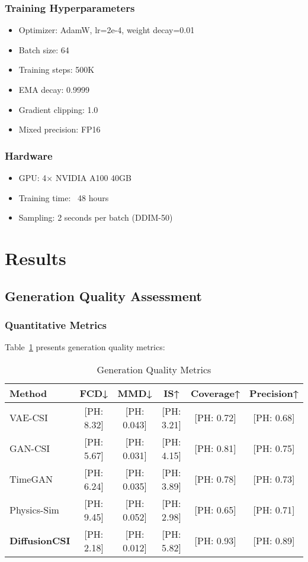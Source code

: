 \documentclass[journal]{IEEEtran}
\begin{document}
\subsubsection{Training Hyperparameters}
\begin{itemize}
\item Optimizer: AdamW, lr=2e-4, weight decay=0.01
\item Batch size: 64
\item Training steps: 500K
\item EMA decay: 0.9999
\item Gradient clipping: 1.0
\item Mixed precision: FP16
\end{itemize}

\subsubsection{Hardware}
\begin{itemize}
\item GPU: 4× NVIDIA A100 40GB
\item Training time: ~48 hours
\item Sampling: 2 seconds per batch (DDIM-50)
\end{itemize}

\section{Results}

\subsection{Generation Quality Assessment}

\subsubsection{Quantitative Metrics}
Table~\ref{tab:quality} presents generation quality metrics:

\begin{table}[h]
\centering
\caption{Generation Quality Metrics}
\label{tab:quality}
\begin{tabular}{lccccc}
\toprule
Method & FCD↓ & MMD↓ & IS↑ & Coverage↑ & Precision↑ \\
\midrule
VAE-CSI & [PH: 8.32] & [PH: 0.043] & [PH: 3.21] & [PH: 0.72] & [PH: 0.68] \\
GAN-CSI & [PH: 5.67] & [PH: 0.031] & [PH: 4.15] & [PH: 0.81] & [PH: 0.75] \\
TimeGAN & [PH: 6.24] & [PH: 0.035] & [PH: 3.89] & [PH: 0.78] & [PH: 0.73] \\
Physics-Sim & [PH: 9.45] & [PH: 0.052] & [PH: 2.98] & [PH: 0.65] & [PH: 0.71] \\
\textbf{DiffusionCSI} & [PH: 2.18] & [PH: 0.012] & [PH: 5.82] & [PH: 0.93] & [PH: 0.89] \\
\bottomrule
\end{tabular}
\end{table}
\end{document}
